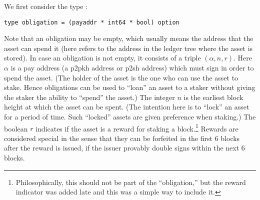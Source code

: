 We first consider the type {}:
\begin{verbatim}
type obligation = (payaddr * int64 * bool) option
\end{verbatim}
Note that an
obligation may be empty, which usually means the address that {}
the asset can spend it (here {} refers to the address in the ledger
tree where the asset is stored).
In case an obligation is not empty, it consists of a triple $(\alpha,n,r)$.
Here $\alpha$ is a pay address (a p2pkh address or p2sh address) which must
sign in order to spend the asset.
(The holder of the asset is the one who can use the asset to stake.
Hence obligations can be used to ``loan'' an asset to a staker
without giving the staker the ability to ``spend'' the asset.)
The integer $n$ is the earliest block height at which the asset can be spent.
(The intention here is to ``lock'' an asset for a period of time. Such ``locked''
assets are given preference when staking.)
The boolean $r$ indicates if the asset is a reward for staking a block.\footnote{Philosophically, this should not be part of the ``obligation,'' but the reward indicator was added late and this was a simple way to include it.}
Rewards are considered special in the sense that they can be forfeited in the first 6 blocks
after the reward is issued, if the issuer provably double signs within the next 6 blocks.

